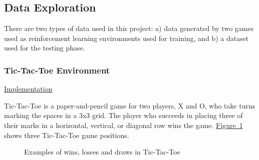 \documentclass{article}
\newcommand{\GithubURL}[2]{
\noindent
\href{https://github.com/davidrobles/mlnd-capstone-code/blob/master/#1}{#2}
\break
}
\begin{document}
\subsection{Data Exploration}

There are two types of data used in this project: a) data generated by two games used as
reinforcement learning environments used for training, and b) a dataset used for the testing phase.

\subsubsection{Tic-Tac-Toe Environment}

\GithubURL{capstone/game/tictactoe.py}{Implementation}

Tic-Tac-Toe is a paper-and-pencil game for two players, X and O, who take turns marking the spaces
in a 3x3 grid. The player who succeeds in placing three of their marks in a horizontal, vertical, or
diagonal row wins the game. \hyperref[fig:tic-env]{Figure~\ref*{fig:tic-env}} shows three
Tic-Tac-Toe game positions.


\begin{figure}[!h]
    \centering
     \hspace{0.2in}
     \hspace{0.2in}
    \caption{Examples of wins, losses and draws in Tic-Tac-Toe}
    \label{fig:tic-env}
\end{figure}
\end{document}
